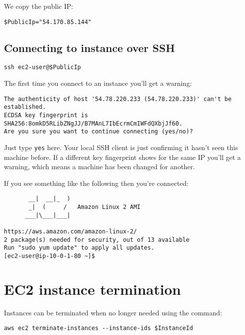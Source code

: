 \documentclass{pgnotes}
\begin{document}
We copy the public IP:
\begin{verbatim}
$PublicIp="54.170.85.144"
\end{verbatim}

\subsection{Connecting to instance over
SSH}\label{sec:connecting-to-instance-over-ssh}

\begin{verbatim}
ssh ec2-user@$PublicIp 
\end{verbatim}

The first time you connect to an instance you'll get a warning:

\begin{verbatim}
The authenticity of host '54.78.220.233 (54.78.220.233)' can't be established.
ECDSA key fingerprint is SHA256:8omkD5RLibZNgJJ/B7MAnL7IbEcrmCmIWFdQXbjJf60.
Are you sure you want to continue connecting (yes/no)?
\end{verbatim}

Just type \texttt{yes} here. Your local SSH client is just confirming it
hasn't seen this machine before. If a different key fingerprint shows
for the same IP you'll get a warning, which means a machine has been
changed for another.

If you see something like the following then you're connected:

\begin{verbatim}
       __|  __|_  )
       _|  (     /   Amazon Linux 2 AMI
      ___|\___|___|

https://aws.amazon.com/amazon-linux-2/
2 package(s) needed for security, out of 13 available
Run "sudo yum update" to apply all updates.
[ec2-user@ip-10-0-1-80 ~]$ 
\end{verbatim}

\section{EC2 instance termination}\label{ec2-instance-termination}

Instances can be terminated when no longer needed using the command:

\begin{verbatim}
aws ec2 terminate-instances --instance-ids $InstanceId
\end{verbatim}
\end{document}
